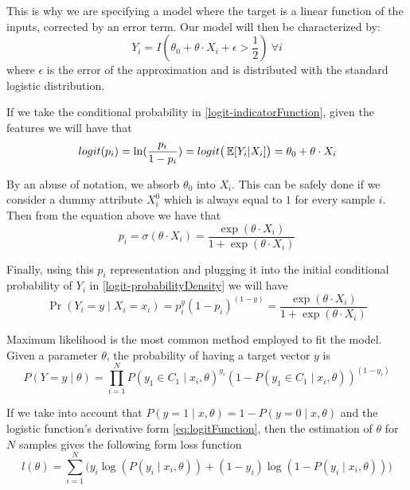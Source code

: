This is why we are specifying a model where the target is a linear function of the inputs, corrected by an error term. Our model will then be characterized by:
\begin{equation}\label{logit-indicatorFunction}
Y_i = I(\theta_0 + \theta \cdot X_i + \epsilon > \frac{1}{2}) \ \forall i 
\end{equation}
where $\epsilon$ is the error of the approximation and is distributed with the standard logistic distribution. %

If we take the conditional probability in \cref{logit-indicatorFunction}, given the features we will have that
\begin{equation}
logit(p_i)= \ln(\frac{p_i}{1-p_i}) = logit\big( \operatorname{\mathbb{E}}[Y_i| X_i] \big) = \theta_0 + \theta \cdot X_i
\end{equation}

By an abuse of notation, we absorb $\theta_0$ into $X_i$. This can be safely done if we consider a dummy attribute $X_i^0$ which is always equal to $1$ for every sample $i$. Then from the equation above we have that
\begin{equation}
p_i = \sigma(\theta \cdot X_i) = \frac{\exp(\theta \cdot X_i) }{1 + \exp(\theta \cdot X_i)}
\end{equation}

Finally, using this $p_i$ representation and plugging it into the initial conditional probability of $Y_i$ in \cref{logit-probabilityDensity} we will have
\begin{equation}
 \Pr(Y_i=y \mid X_i = x_i) = p_i^{y} {(1-p_i)}^{(1-y)} = \frac{\exp(\theta \cdot X_i) }{1 + \exp(\theta \cdot X_i)}
 \end{equation}


Maximum likelihood is the most common method employed to fit the model. %
Given a parameter $\theta$, the probability of having a target vector $y$ is
\begin{equation}
P(Y =y \mid \theta ) = \prod_{i=1}^N {P(y_1 \in C_1 \mid x_i, \theta)}^{y_i} {(1 - P(y_1 \in C_1 \mid x_i, \theta) )}^{(1-y_i)}
\end{equation}

If we take into account that $P(y=1 \mid x,\theta) = 1 - P(y=0 \mid x,\theta)$ and the logistic function's derivative form \cref{eq:logitFunction}, then the estimation of $\theta$ for $N$ samples gives the following form
loss function
\begin{equation}\label{eq:logLossFunction}
l(\theta) = \sum_{i=1}^N \big(y_i \log(P(y_i \mid x_i,\theta)) + (1-y_i)\log(1 - P(y_i \mid x_i,\theta) ) \big)
\end{equation}

